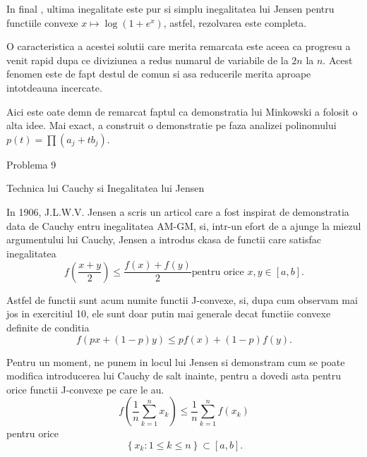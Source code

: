 \documentclass[a4paper,12pt,oneside]{report}
\begin{document}
In final , ultima inegalitate este pur si simplu inegalitatea lui Jensen pentru functiile convexe \(x \mapsto \log \left ( 1 + e^{x} \right )\), astfel, rezolvarea este completa. 

O caracteristica a acestei solutii care merita remarcata este aceea ca progresu a venit rapid dupa ce diviziunea a redus numarul de variabile de la \(2n\) la \(n\). Acest fenomen este de fapt destul de comun si asa reducerile merita aproape intotdeauna incercate. 

Aici este oate demn de remarcat faptul ca demonstratia lui Minkowski a folosit o alta idee. Mai exact, a construit o demonstratie pe faza analizei polinomului \(p\left ( t \right ) = \prod \left ( a_{j}  + tb_{j}\right )\).

Problema 9 

Technica lui Cauchy si Inegalitatea lui Jensen

In 1906, J.L.W.V. Jensen a scris un articol care a fost inspirat de demonstratia data de Cauchy entru inegalitatea AM-GM, si, intr-un efort de a ajunge la miezul argumentului lui Cauchy, Jensen a introdus ckasa de functii care satisfac inegalitatea 
\begin{displaymath}
  f\left ( \frac{x + y}{2} \right ) \leq \frac{f\left ( x \right ) + f\left ( y \right )}{2} \text{pentru orice } x,y \in \left [ a, b \right ]. \label{eq:2.14} \tag{2.14}
\end{displaymath}

Astfel de functii sunt acum numite functii J-convexe, si, dupa cum observam mai jos in exercitiul 10, ele sunt doar putin mai generale decat functiie convexe definite de conditia
\begin{displaymath}
  f\left ( px + \left ( 1 - p \right )y \right )\leq pf\left ( x \right ) + \left ( 1-p \right )f\left ( y \right ). 
\end{displaymath} 

Pentru un moment, ne punem in locul lui Jensen si demonstram cum se poate modifica introducerea lui Cauchy de salt inainte, pentru a dovedi asta pentru orice functii  J-convexe pe care le au. 
\begin{displaymath}
  f\left ( \frac{1}{n} \sum_{k = 1}^{n}x_{k}\right )\leq \frac{1}{n}\sum_{k = 1}^{n}f\left ( x_{k} \right )
\end{displaymath}
pentru orice 
\begin{displaymath}
  \left \{ x_{k}: 1\leq k \leq n \right \} \subset \left [ a, b \right ]. \label{eq:2.15} \tag{2.15}
\end{displaymath}
\end{document}
